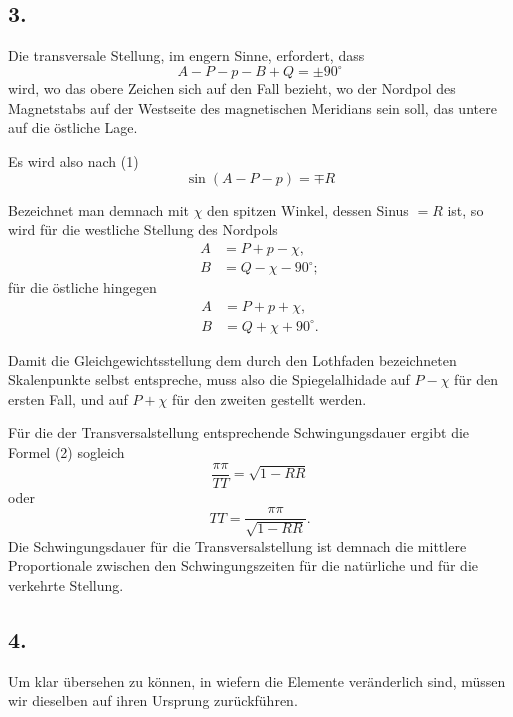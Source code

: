 \documentclass[12pt,a4paper]{article}
\begin{document}
\subsection*{3.}

Die transversale Stellung, im engern Sinne, erfordert, dass
\begin{equation*}
A - P - p - B + Q = \pm 90^{\circ}
\end{equation*}
wird, wo das obere Zeichen sich auf den Fall bezieht, wo der Nordpol des Magnetstabs auf der Westseite des magnetischen Meridians sein soll, das untere auf die östliche Lage.

Es wird also nach (1)
\begin{equation*}
\sin(A - P - p) = \mp R
\end{equation*}

Bezeichnet man demnach mit $\chi$ den spitzen Winkel, dessen Sinus $= R$ ist, so wird für die westliche Stellung des Nordpols
\begin{align*}
A &= P + p - \chi,\\
B &= Q - \chi - 90^{\circ};
\end{align*}
für die östliche hingegen
\begin{align*}
A &= P + p + \chi,\\
B &= Q + \chi + 90^{\circ}.
\end{align*}

Damit die Gleichgewichtsstellung dem durch den Lothfaden bezeichneten Skalenpunkte selbst entspreche, muss also die Spiegelalhidade auf $P - \chi$ für den ersten Fall, und auf $P + \chi$ für den zweiten gestellt werden.

Für die der Transversalstellung entsprechende Schwingungsdauer ergibt die Formel (2) sogleich
\begin{equation}
\frac{\pi\pi}{TT} = \sqrt{1 - RR}
\end{equation}
oder
\begin{equation}
TT = \frac{\pi\pi}{\sqrt{1 - RR}}.
\end{equation}
Die Schwingungsdauer für die Transversalstellung ist demnach die mittlere Proportionale zwischen den Schwingungszeiten für die natürliche und für die verkehrte Stellung.

\subsection*{4.}

Um klar übersehen zu können, in wiefern die Elemente veränderlich sind, müssen wir dieselben auf ihren Ursprung zurückführen.
\end{document}
